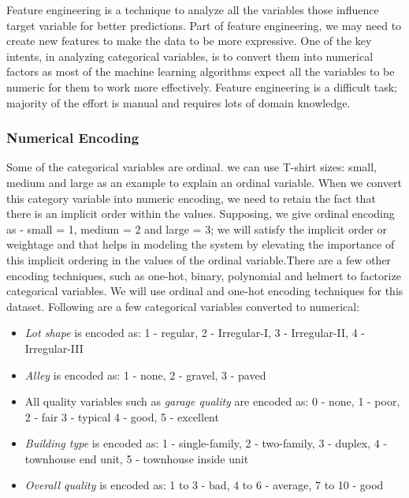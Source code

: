 \documentclass[sigconf]{acmart}
\begin{document}
	Feature engineering is a technique to analyze all the variables those influence target variable for better predictions. Part of feature engineering, we may need to create new features to make the data to be more expressive. One of the key intents, in analyzing categorical variables, is to convert them into numerical factors as most of the machine learning algorithms expect all the variables to be numeric for them to work more effectively. Feature engineering is a difficult task; majority of the effort is manual and requires lots of domain knowledge.
	
	\subsubsection{Numerical Encoding}
	 Some of the categorical variables are ordinal. we can use T-shirt sizes: small, medium and large as an example to explain an ordinal variable. When we convert this category variable into numeric encoding, we need to retain the fact that there is an implicit order within the values. Supposing, we give ordinal encoding as - small = 1, medium = 2 and large = 3; we will satisfy the implicit order or weightage and that helps in modeling the system by elevating the importance of this implicit ordering in the values of the ordinal variable.There are a few other encoding techniques, such as one-hot, binary, polynomial and helmert to factorize categorical variables. We will use ordinal and one-hot encoding techniques for this dataset. Following are a few categorical variables converted to numerical:
	
	\begin{itemize}
		\item {\em Lot shape} is encoded as: 1 - regular, 2 - Irregular-I, 3 - Irregular-II, 4 - Irregular-III
		 \item {\em Alley} is encoded as: 1 - none, 2 - gravel, 3 - paved
		 \item All quality variables such as {\em garage quality} are encoded as: 0 - none, 1 - poor, 2 - fair 3 - typical 4 - good, 5 - excellent
		 \item {\em Building type} is encoded as: 1 - single-family, 2 - two-family, 3 - duplex, 4 - townhouse end unit, 5 - townhouse inside unit
		 \item {\em Overall quality} is encoded as: 1 to 3 - bad, 4 to 6 - average, 7 to 10 - good		 
		 
	\end{itemize}
\end{document}
